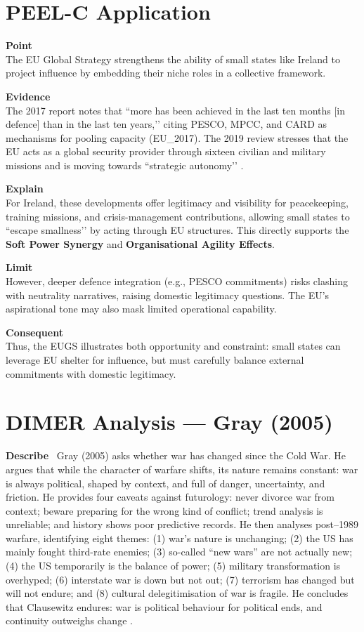 \section*{PEEL-C Application}

\textbf{Point} \\  
The EU Global Strategy strengthens the ability of small states like Ireland to project influence by embedding their niche roles in a collective framework.  

\textbf{Evidence} \\  
The 2017 report notes that ``more has been achieved in the last ten months [in defence] than in the last ten years,’’ citing PESCO, MPCC, and CARD as mechanisms for pooling capacity (EU\_2017). The 2019 review stresses that the EU acts as a global security provider through sixteen civilian and military missions and is moving towards ``strategic autonomy’’ \parencite{EU_2019}.  

\textbf{Explain} \\  
For Ireland, these developments offer legitimacy and visibility for peacekeeping, training missions, and crisis-management contributions, allowing small states to ``escape smallness’’ by acting through EU structures. This directly supports the \textbf{Soft Power Synergy} and \textbf{Organisational Agility Effects}.  

\textbf{Limit} \\  
However, deeper defence integration (e.g., PESCO commitments) risks clashing with neutrality narratives, raising domestic legitimacy questions. The EU’s aspirational tone may also mask limited operational capability.  

\textbf{Consequent} \\  
Thus, the EUGS illustrates both opportunity and constraint: small states can leverage EU shelter for influence, but must carefully balance external commitments with domestic legitimacy.  

\section*{DIMER Analysis — Gray (2005)}

\textbf{Describe} \
Gray (2005) asks whether war has changed since the Cold War. He argues that while the character of warfare shifts, its nature remains constant: war is always political, shaped by context, and full of danger, uncertainty, and friction. He provides four caveats against futurology: never divorce war from context; beware preparing for the wrong kind of conflict; trend analysis is unreliable; and history shows poor predictive records. He then analyses post–1989 warfare, identifying eight themes: (1) war’s nature is unchanging; (2) the US has mainly fought third-rate enemies; (3) so-called “new wars” are not actually new; (4) the US temporarily is the balance of power; (5) military transformation is overhyped; (6) interstate war is down but not out; (7) terrorism has changed but will not endure; and (8) cultural delegitimisation of war is fragile. He concludes that Clausewitz endures: war is political behaviour for political ends, and continuity outweighs change \parencite{GRAY_2005}.


